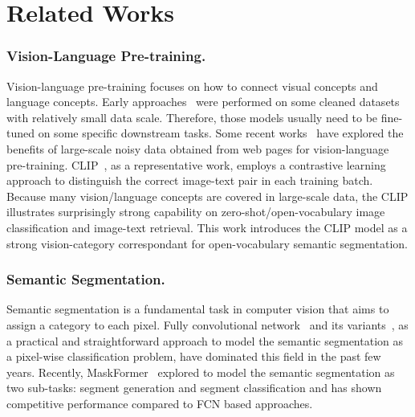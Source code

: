 \documentclass[runningheads]{llncs}
\begin{document}
\section{Related Works}
\subsubsection{Vision-Language Pre-training.}
Vision-language pre-training focuses on how to connect visual concepts and language concepts. Early approaches~\cite{su2019vl,lu2019vilbert,chen2019uniter,li2020unicoder,li2020oscar} were performed on some cleaned datasets with relatively small data scale. Therefore, those models usually need to be fine-tuned on some specific downstream tasks. Some recent works~\cite{radford2021learning,jia2021scaling} have explored the benefits of large-scale noisy data obtained from web pages for vision-language pre-training. CLIP~\cite{radford2021learning}, as a representative work, employs a contrastive learning approach to distinguish the correct image-text pair in each training batch. Because many vision/language concepts are covered in large-scale data, the CLIP illustrates surprisingly strong capability on zero-shot/open-vocabulary image classification and image-text retrieval. This work introduces the CLIP model as a strong vision-category correspondant for open-vocabulary semantic segmentation.

\subsubsection{Semantic Segmentation.} 
Semantic segmentation is a fundamental task in computer vision that aims to assign a category to each pixel. Fully convolutional network~\cite{long2015fully} and its variants~\cite{chen2017deeplab,yin2020disentangled,badrinarayanan2017segnet}, as a practical and straightforward approach to model the semantic segmentation as a pixel-wise classification problem, have dominated this field in the past few years. Recently, MaskFormer~\cite{cheng2021per} explored to model the semantic segmentation as two sub-tasks: segment generation and segment classification and has shown competitive performance compared to FCN based approaches. 
\end{document}
